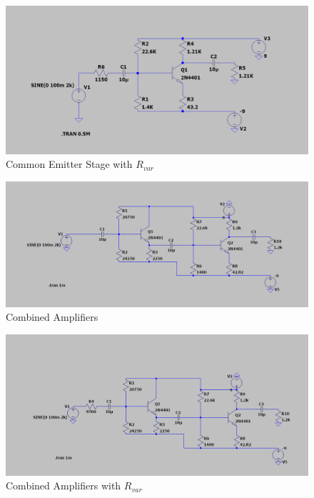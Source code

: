 \documentclass[12pt]{article}
\begin{document}
\begin{figure}[H]
    \centering
    \includegraphics[width=\linewidth]{Lab2/CE_Rin.png}
    \caption{Common Emitter Stage with \(R_{var}\)}
\end{figure}

\begin{figure}[H]
    \centering
    \includegraphics[width=\linewidth]{Lab2/All.png}
    \caption{Combined Amplifiers}
\end{figure}

\begin{figure}[H]
    \centering
    \includegraphics[width=\linewidth]{Lab2/All_Rin.png}
    \caption{Combined Amplifiers with \(R_{var}\)}
\end{figure}


\end{document}
